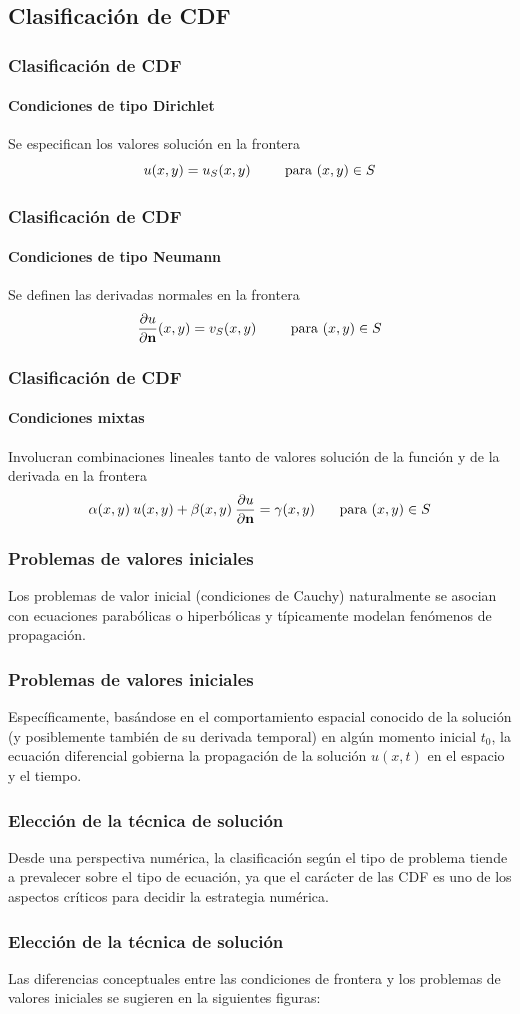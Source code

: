 \documentclass[12pt]{beamer}
\begin{document}
\subsection{Clasificación de CDF}
\begin{frame}
\frametitle{Clasificación de CDF}
\framesubtitle{Condiciones de tipo Dirichlet}
Se especifican los valores solución en la frontera
\[ u(x, y) = u_{S}(x, y) \hspace{0.75cm} \mbox{ para } (x, y) \in S \]
\end{frame}
\begin{frame}
\frametitle{Clasificación de CDF}
\framesubtitle{Condiciones de tipo Neumann}
Se definen las derivadas normales en la frontera
\[ \dfrac{\partial u}{\partial \mathbf{n}} (x, y) = v_{S}(x, y) \hspace{0.75cm} \mbox{ para } (x, y) \in S \]
\end{frame}
\begin{frame}
\frametitle{Clasificación de CDF}
\framesubtitle{Condiciones mixtas}
Involucran combinaciones lineales tanto de valores solución de la función y de la derivada en la frontera
\[ \alpha(x, y) \: u(x, y) + \beta(x, y) \: \dfrac{\partial u}{\partial \mathbf{n}} = \gamma(x, y) \hspace{0.5cm} \mbox{ para } (x, y) \in S \]
\end{frame}
\begin{frame}
\frametitle{Problemas de valores iniciales}
Los problemas de valor inicial (condiciones de Cauchy) naturalmente se asocian con ecuaciones parabólicas o hiperbólicas y típicamente modelan fenómenos de propagación.
\end{frame}
\begin{frame}
\frametitle{Problemas de valores iniciales}
Específicamente, basándose en el comportamiento espacial conocido de la solución (y posiblemente también de su derivada temporal) en algún momento inicial $t_{0}$, la ecuación diferencial gobierna la propagación de la solución $u(x, t)$ en el espacio y el tiempo.
\end{frame}
\begin{frame}
\frametitle{Elección de la técnica de solución}
Desde una perspectiva numérica, la clasificación según el tipo de problema tiende a prevalecer sobre el tipo de ecuación, ya que el carácter de las CDF es uno de los aspectos críticos para decidir la estrategia numérica.
\end{frame}
\begin{frame}
\frametitle{Elección de la técnica de solución}
Las diferencias conceptuales entre las condiciones de frontera y los problemas de valores iniciales se sugieren en la siguientes figuras:
\end{frame}
\end{document}
